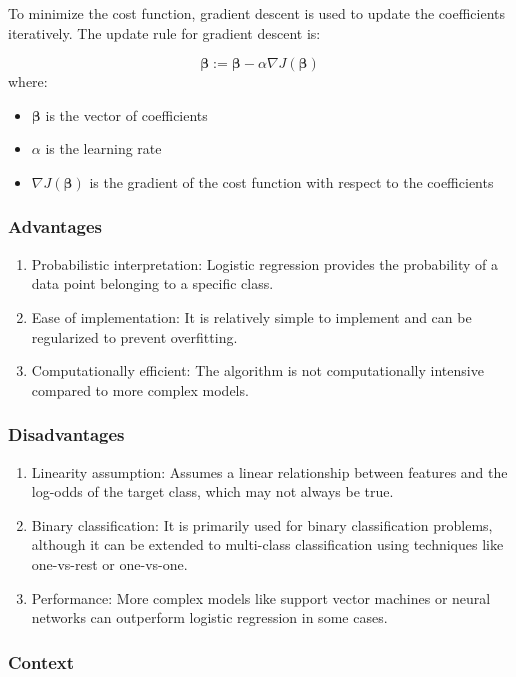 \documentclass[12pt]{article}
\begin{document}
To minimize the cost function, gradient descent is used to update the coefficients iteratively. The update rule for gradient descent is:

$$\boldsymbol{\beta} := \boldsymbol{\beta} - \alpha \nabla J(\boldsymbol{\beta})$$
where:
\begin{itemize}
\item $\boldsymbol{\beta}$ is the vector of coefficients
\item $\alpha$ is the learning rate
\item $\nabla J(\boldsymbol{\beta})$ is the gradient of the cost function with respect to the coefficients
\end{itemize}

\subsubsection{Advantages}
\begin{enumerate}
\item Probabilistic interpretation: Logistic regression provides the probability of a data point belonging to a specific class.
\item Ease of implementation: It is relatively simple to implement and can be regularized to prevent overfitting.
\item Computationally efficient: The algorithm is not computationally intensive compared to more complex models.
\end{enumerate}

\subsubsection{Disadvantages}
\begin{enumerate}
\item Linearity assumption: Assumes a linear relationship between features and the log-odds of the target class, which may not always be true.
\item Binary classification: It is primarily used for binary classification problems, although it can be extended to multi-class classification using techniques like one-vs-rest or one-vs-one.
\item Performance: More complex models like support vector machines or neural networks can outperform logistic regression in some cases.
\end{enumerate}

\subsubsection{Context}
\end{document}
